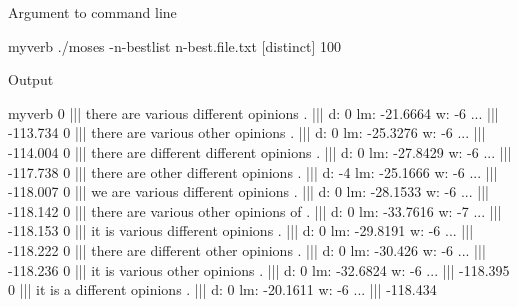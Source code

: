 \documentclass[landscape]{uedslides2C}
\begin{document}
\vspace{5mm}
\begin{center}
Argument to command line\\[2mm]
\begin{SaveVerbatim}{myverb}
 ./moses -n-bestlist n-best.file.txt [distinct] 100
\end{SaveVerbatim}
\colorbox{gray}{}

\vspace{10mm}
Output\\[2mm]
{\footnotesize \begin{SaveVerbatim}{myverb}
0 ||| there are various different opinions .  ||| d: 0 lm: -21.6664 w: -6 ...  ||| -113.734
0 ||| there are various other opinions .  ||| d: 0 lm: -25.3276 w: -6 ... ||| -114.004
0 ||| there are different different opinions .  ||| d: 0 lm: -27.8429 w: -6 ...  ||| -117.738
0 ||| there are other different opinions .  ||| d: -4 lm: -25.1666 w: -6 ...  ||| -118.007
0 ||| we are various different opinions .  ||| d: 0 lm: -28.1533 w: -6 ...  ||| -118.142
0 ||| there are various other opinions of .  ||| d: 0 lm: -33.7616 w: -7 ...  ||| -118.153
0 ||| it is various different opinions .  ||| d: 0 lm: -29.8191 w: -6  ... ||| -118.222
0 ||| there are different other opinions .  ||| d: 0 lm: -30.426 w: -6 ...  ||| -118.236
0 ||| it is various other opinions .  ||| d: 0 lm: -32.6824 w: -6 ... ||| -118.395
0 ||| it is a different opinions .  ||| d: 0 lm: -20.1611 w: -6 ...  ||| -118.434

\end{SaveVerbatim}
\colorbox{gray}{}}
\end{center}
 
\end{document}
